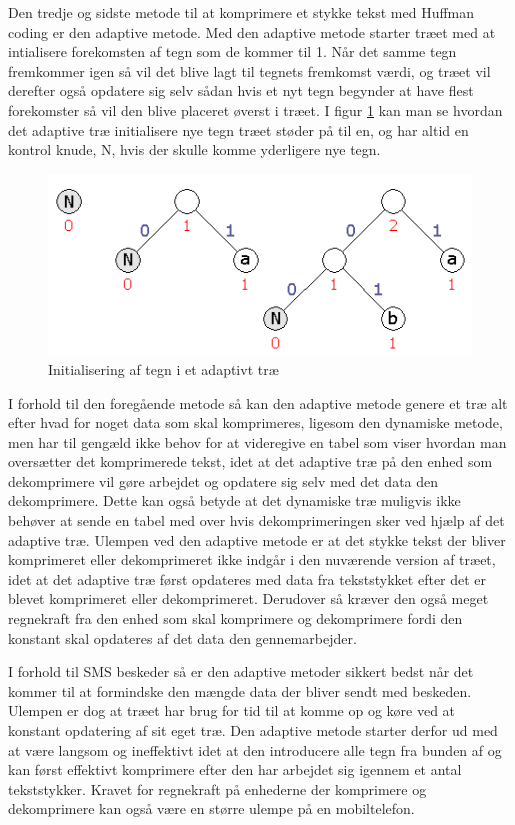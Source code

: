 Den tredje og sidste metode til at komprimere et stykke tekst med Huffman coding er den adaptive metode. Med den adaptive metode starter træet med at intialisere forekomsten af tegn som de kommer til 1. Når det samme tegn fremkommer igen så vil det blive lagt til tegnets fremkomst værdi, og træet vil derefter også opdatere sig selv sådan hvis et nyt tegn begynder at have flest forekomster så vil den blive placeret øverst i træet. I figur \ref{fig:adaptive_tree} kan man se hvordan det adaptive træ initialisere nye tegn træet støder på til en, og har altid en kontrol knude, N, hvis der skulle komme yderligere nye tegn.

\begin{figure}[H]
\centering
\includegraphics[width=\linewidth]{Billeder/adaptivt.png}
\caption{Initialisering af tegn i et adaptivt træ \cite{Hufftree_1}}
\label{fig:adaptive_tree}
\end{figure}

I forhold til den foregående metode så kan den adaptive metode genere et træ alt efter hvad for noget data som skal komprimeres, ligesom den dynamiske metode, men har til gengæld ikke behov for at videregive en tabel som viser hvordan man oversætter det komprimerede tekst, idet at det adaptive træ på den enhed som dekomprimere vil gøre arbejdet og opdatere sig selv med det data den dekomprimere. Dette kan også betyde at det dynamiske træ muligvis ikke behøver at sende en tabel med over hvis dekomprimeringen sker ved hjælp af det adaptive træ. Ulempen ved den adaptive metode er at det stykke tekst der bliver komprimeret eller dekomprimeret ikke indgår i den nuværende version af træet, idet at det adaptive træ først opdateres med data fra tekststykket efter det er blevet komprimeret eller dekomprimeret. Derudover så kræver den også meget regnekraft fra den enhed som skal komprimere og dekomprimere fordi den konstant skal opdateres af det data den gennemarbejder. \cite{Hufftree_5}

I forhold til SMS beskeder så er den adaptive metoder sikkert bedst når det kommer til at formindske den mængde data der bliver sendt med beskeden. Ulempen er dog at træet har brug for tid til at komme op og køre ved at konstant opdatering af sit eget træ. Den adaptive metode starter derfor ud med at være langsom og ineffektivt idet at den introducere alle tegn fra bunden af og kan først effektivt komprimere efter den har arbejdet sig igennem et antal tekststykker. Kravet for regnekraft på enhederne der komprimere og dekomprimere kan også være en større ulempe på en mobiltelefon.
